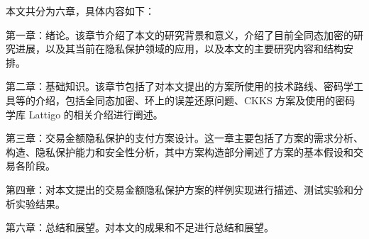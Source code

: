 本文共分为六章，具体内容如下：

第一章：绪论。该章节介绍了本文的研究背景和意义，介绍了目前全同态加密的研究进展，以及其当前在隐私保护领域的应用，以及本文的主要研究内容和结构安排。

第二章：基础知识。该章节包括了对本文提出的方案所使用的技术路线、密码学工具等的介绍，包括全同态加密、环上的误差还原问题、CKKS 方案及使用的密码学库 Lattigo 的相关介绍进行阐述。

第三章：交易金额隐私保护的支付方案设计。这一章主要包括了方案的需求分析、构造、隐私保护能力和安全性分析，其中方案构造部分阐述了方案的基本假设和交易各阶段。

第四章：对本文提出的交易金额隐私保护方案的样例实现进行描述、测试实验和分析实验结果。



第六章：总结和展望。对本文的成果和不足进行总结和展望。
